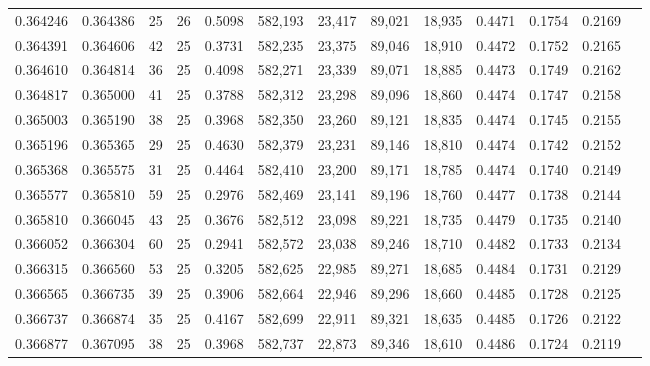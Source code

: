 \begin{tabular}{rrrrrrrrrrrrr}
0.364246 & 0.364386 &    25 &  26 &                                     0.5098 & 582,193 &  23,417 &  89,021 &  18,935 & 0.4471 & 0.1754 & 0.2169 \\
0.364391 & 0.364606 &    42 &  25 &                                     0.3731 & 582,235 &  23,375 &  89,046 &  18,910 & 0.4472 & 0.1752 & 0.2165 \\
0.364610 & 0.364814 &    36 &  25 &                                     0.4098 & 582,271 &  23,339 &  89,071 &  18,885 & 0.4473 & 0.1749 & 0.2162 \\
0.364817 & 0.365000 &    41 &  25 &                                     0.3788 & 582,312 &  23,298 &  89,096 &  18,860 & 0.4474 & 0.1747 & 0.2158 \\
0.365003 & 0.365190 &    38 &  25 &                                     0.3968 & 582,350 &  23,260 &  89,121 &  18,835 & 0.4474 & 0.1745 & 0.2155 \\
0.365196 & 0.365365 &    29 &  25 &                                     0.4630 & 582,379 &  23,231 &  89,146 &  18,810 & 0.4474 & 0.1742 & 0.2152 \\
0.365368 & 0.365575 &    31 &  25 &                                     0.4464 & 582,410 &  23,200 &  89,171 &  18,785 & 0.4474 & 0.1740 & 0.2149 \\
0.365577 & 0.365810 &    59 &  25 &                                     0.2976 & 582,469 &  23,141 &  89,196 &  18,760 & 0.4477 & 0.1738 & 0.2144 \\
0.365810 & 0.366045 &    43 &  25 &                                     0.3676 & 582,512 &  23,098 &  89,221 &  18,735 & 0.4479 & 0.1735 & 0.2140 \\
0.366052 & 0.366304 &    60 &  25 &                                     0.2941 & 582,572 &  23,038 &  89,246 &  18,710 & 0.4482 & 0.1733 & 0.2134 \\
0.366315 & 0.366560 &    53 &  25 &                                     0.3205 & 582,625 &  22,985 &  89,271 &  18,685 & 0.4484 & 0.1731 & 0.2129 \\
0.366565 & 0.366735 &    39 &  25 &                                     0.3906 & 582,664 &  22,946 &  89,296 &  18,660 & 0.4485 & 0.1728 & 0.2125 \\
0.366737 & 0.366874 &    35 &  25 &                                     0.4167 & 582,699 &  22,911 &  89,321 &  18,635 & 0.4485 & 0.1726 & 0.2122 \\
0.366877 & 0.367095 &    38 &  25 &                                     0.3968 & 582,737 &  22,873 &  89,346 &  18,610 & 0.4486 & 0.1724 & 0.2119 \\

\end{tabular}
